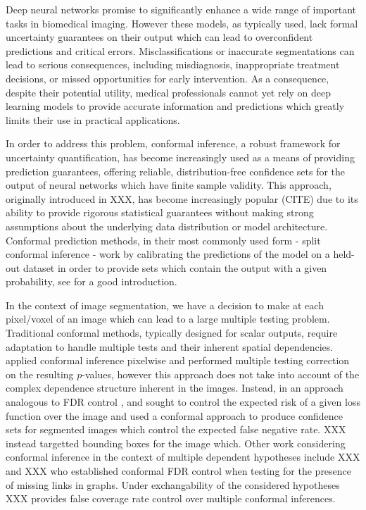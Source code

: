 


Deep neural networks promise to significantly enhance a wide range of important tasks in biomedical imaging. However these models, as typically used, lack formal uncertainty guarantees on their output which can lead to overconfident predictions and critical errors. Misclassifications or inaccurate segmentations can lead to serious consequences, including misdiagnosis, inappropriate treatment decisions, or missed opportunities for early intervention.  As a consequence, despite their potential utility, medical professionals cannot yet rely on deep learning models to provide accurate information and predictions which greatly limits their use in practical applications. 

In order to address this problem, conformal inference, a robust framework for uncertainty quantification, has become increasingly used as a means of providing prediction guarantees, offering reliable, distribution-free confidence sets for the output of neural networks which have finite sample validity. This approach, originally introduced in XXX, has become increasingly popular (CITE) due to its ability to provide rigorous statistical guarantees without making strong assumptions about the underlying data distribution or model architecture. Conformal prediction methods, in their most commonly used form - split conformal inference - work by calibrating the predictions of the model on a held-out dataset in order to provide sets which contain the output with a given probability, see \cite{Angelopoulos2021} for a good introduction.

In the context of image segmentation, we have a decision to make at each pixel/voxel of an image which can lead to a large multiple testing problem. Traditional conformal methods, typically designed for scalar outputs, require adaptation to handle multiple tests and their inherent spatial dependencies. \cite{Angelopoulos2021LTT} applied conformal inference pixelwise and performed multiple testing correction on the resulting $p$-values, however this approach does not take into account of the complex dependence structure inherent in the images. Instead, in an approach analogous to FDR control \citep{Benjamini1995}, \cite{Bates2021} and \cite{Angelopoulos2022} sought to control the expected risk of a given loss function over the image and used a conformal approach to produce confidence sets for segmented images which control the expected false negative rate. XXX instead targetted bounding boxes for the image which. Other work considering conformal inference in the context of multiple dependent hypotheses include XXX and XXX who established conformal FDR control when testing for the presence of missing links in graphs. Under exchangability of the considered hypotheses XXX provides false coverage rate control over multiple conformal inferences.

